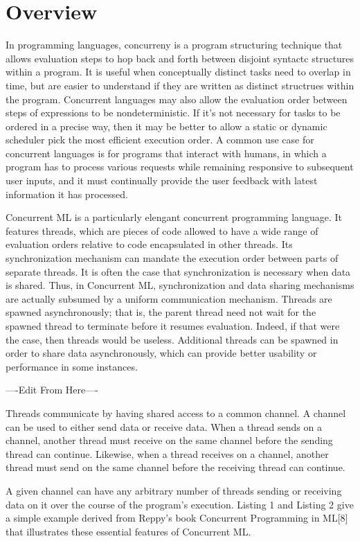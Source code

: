 \documentclass{article}
\begin{document}
\section{Overview}
In programming languages, concurreny is a program structuring technique that allows evaluation
steps to hop back and forth between disjoint syntactc structures within a program. It is useful
when conceptually distinct tasks need to overlap in time, but are easier to understand if they
are written as distinct structrues within the program. Concurrent languages may also allow the
evaluation order between steps of expressions to be nondeterministic. If it's not necessary for
tasks to be ordered in a precise way, then it may be better to allow a static or dynamic
scheduler pick the most efficient execution order. A common use case for concurrent languages
is for programs that interact with humans, in which a program has to process various requests
while remaining responsive to subsequent user inputs, and it must continually provide the user
feedback with latest information it has processed.

Concurrent ML is a particularly elengant concurrent programming language.
It features threads, which are pieces of code allowed to have a wide range of
evaluation orders relative to code encapsulated in other threads. Its synchronization
mechanism can mandate the execution order between parts of separate threads. It is often the
case that synchronization is necessary when data is shared. Thus, in Concurrent ML,
synchronization and data sharing mechanisms are actually subsumed by a uniform communication
mechanism. Threads are spawned asynchronously; that is, the parent thread need not wait for the
spawned thread to terminate before it resumes evaluation. Indeed, if that were the case, then
threads would be useless. Additional threads can be spawned in order to share data
asynchronously, which can provide better usability or performance in some instances.




----Edit From Here----

Threads communicate by having shared access to a common channel.  A channel can be used to
either send data or receive data.  When a thread sends on a channel, another thread must
receive on the same channel before the sending thread can continue.  Likewise, when a thread
receives on a channel, another thread must send on the same channel before the receiving thread
can continue.

A given channel can have any arbitrary number of threads sending or receiving data on it over
the course of the program's execution.  Listing 1 and Listing 2 give a simple example derived
from Reppy's book Concurrent Programming in ML[8] that illustrates these essential features of
Concurrent ML.
\end{document}
